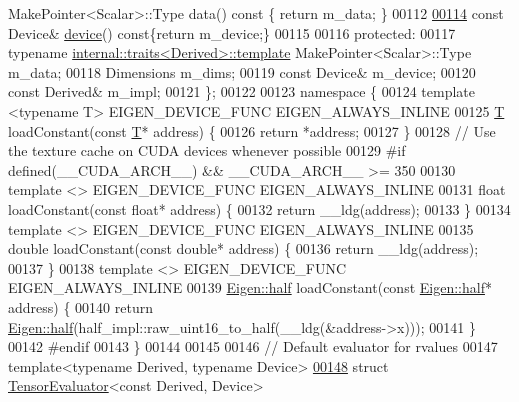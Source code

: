 \begin{DoxyCode}
      MakePointer<Scalar>::Type data()\textcolor{keyword}{ const }\{ \textcolor{keywordflow}{return} m\_data; \}
00112 
\hyperlink{struct_eigen_1_1_tensor_evaluator_a98b51809ed8f7a1f736eb7b952b9636e}{00114}   \textcolor{keyword}{const} Device& \hyperlink{struct_eigen_1_1_tensor_evaluator_a98b51809ed8f7a1f736eb7b952b9636e}{device}()\textcolor{keyword}{ const}\{\textcolor{keywordflow}{return} m\_device;\}
00115 
00116  \textcolor{keyword}{protected}:
00117   \textcolor{keyword}{typename} \hyperlink{struct_eigen_1_1internal_1_1traits}{internal::traits<Derived>::template} MakePointer<Scalar>::Type
       m\_data;
00118   Dimensions m\_dims;
00119   \textcolor{keyword}{const} Device& m\_device;
00120   \textcolor{keyword}{const} Derived& m\_impl;
00121 \};
00122 
00123 \textcolor{keyword}{namespace }\{
00124 \textcolor{keyword}{template} <\textcolor{keyword}{typename} T> EIGEN\_DEVICE\_FUNC EIGEN\_ALWAYS\_INLINE
00125 \hyperlink{group___sparse_core___module}{T} loadConstant(\textcolor{keyword}{const} \hyperlink{group___sparse_core___module}{T}* address) \{
00126   \textcolor{keywordflow}{return} *address;
00127 \}
00128 \textcolor{comment}{// Use the texture cache on CUDA devices whenever possible}
00129 \textcolor{preprocessor}{#if defined(\_\_CUDA\_ARCH\_\_) && \_\_CUDA\_ARCH\_\_ >= 350}
00130 \textcolor{keyword}{template} <> EIGEN\_DEVICE\_FUNC EIGEN\_ALWAYS\_INLINE
00131 \textcolor{keywordtype}{float} loadConstant(\textcolor{keyword}{const} \textcolor{keywordtype}{float}* address) \{
00132   \textcolor{keywordflow}{return} \_\_ldg(address);
00133 \}
00134 \textcolor{keyword}{template} <> EIGEN\_DEVICE\_FUNC EIGEN\_ALWAYS\_INLINE
00135 \textcolor{keywordtype}{double} loadConstant(\textcolor{keyword}{const} \textcolor{keywordtype}{double}* address) \{
00136   \textcolor{keywordflow}{return} \_\_ldg(address);
00137 \}
00138 \textcolor{keyword}{template} <> EIGEN\_DEVICE\_FUNC EIGEN\_ALWAYS\_INLINE
00139 \hyperlink{struct_eigen_1_1half}{Eigen::half} loadConstant(\textcolor{keyword}{const} \hyperlink{struct_eigen_1_1half}{Eigen::half}* address) \{
00140   \textcolor{keywordflow}{return} \hyperlink{struct_eigen_1_1half}{Eigen::half}(half\_impl::raw\_uint16\_to\_half(\_\_ldg(&address->x)));
00141 \}
00142 \textcolor{preprocessor}{#endif}
00143 \}
00144 
00145 
00146 \textcolor{comment}{// Default evaluator for rvalues}
00147 \textcolor{keyword}{template}<\textcolor{keyword}{typename} Derived, \textcolor{keyword}{typename} Device>
\hyperlink{struct_eigen_1_1_tensor_evaluator_3_01const_01_derived_00_01_device_01_4}{00148} \textcolor{keyword}{struct }\hyperlink{struct_eigen_1_1_tensor_evaluator}{TensorEvaluator}<const Derived, Device>

\end{DoxyCode}
